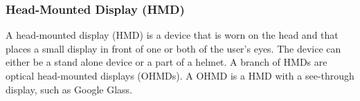 %
%
%
%
%
%
%
%	
%	
%	
%
%
%
%
%
%
%
%
\subsubsection{Head-Mounted Display (HMD)}
\label{subsubsec:hmd}
A head-mounted display (HMD)\cite{hmdWiki} is a device that is worn on the head and that places a small display in front of one or both of the user's eyes. The device can either be a stand alone device or a part of a helmet. A branch of HMDs are optical head-mounted displays (OHMDs)\cite{ohmdWiki}. A OHMD is a HMD with a see-through display, such as Google Glass.


